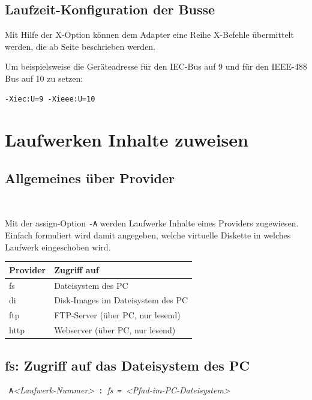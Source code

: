 \documentclass[10pt,a4paper]{scrartcl}		%
\begin{document}
\subsection{Laufzeit-Konfiguration der Busse}
\mbox{ \Big[ \ldots \Big] }

Mit Hilfe der X-Option können dem Adapter eine Reihe
X-Befehle übermittelt werden, die ab Seite \pageref{xcommands}
beschrieben werden.

Um beispielsweise die Geräteadresse für den IEC-Bus auf
9 und für den \mbox{IEEE-488} Bus auf 10 zu setzen:

\begin{verbatim}
-Xiec:U=9 -Xieee:U=10
\end{verbatim}

\clearpage
\section{Laufwerken Inhalte zuweisen}
\label{assign}

\subsection{Allgemeines über Provider}

\mbox{ \Big[ \texttt{A}\textit{<Laufwerk-Nummer>} 
\texttt{:} \textit{<Provider>} \texttt{=}
\textit{<Parameter>} \Big] \Big[ \ldots \Big] }

Mit der \glqq{}assign\grqq{}-Option \texttt{-A} werden Laufwerke Inhalte
eines Providers zugewiesen. Einfach formuliert wird damit angegeben,
welche \glqq{}virtuelle Diskette\grqq{} in welches Laufwerk
eingeschoben wird.

\begin{tabular}[c]{l l}
\toprule 
Provider & Zugriff auf \\
\midrule
fs & Dateisystem des PC \\
di & Disk-Images im Dateisystem des PC  \\
ftp & FTP-Server (über PC, nur lesend) \\
http & Webserver (über PC, nur lesend) \\
\bottomrule
\end{tabular}

\subsection{fs: Zugriff auf das Dateisystem des PC}
\mbox{ \texttt{A}\textit{<Laufwerk-Nummer>} 
\texttt{:} \textit{fs} \texttt{=}
\textit{<Pfad-im-PC-Dateisystem>} }
\end{document}
